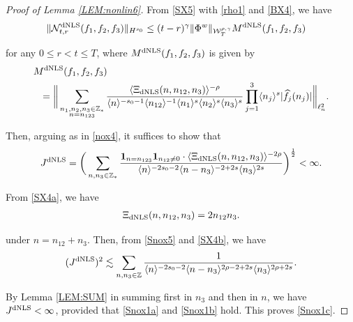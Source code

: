 \documentclass[letterpaper, 11pt,  reqno]{amsart}
\newcommand{\1}{\hspace{0.5mm}\text{I}\hspace{0.5mm}}
\newcommand{\noi}{\noindent}
\newcommand{\Z}{\mathbb{Z}}
\newcommand{\g}{\gamma}
\newcommand{\ft}{\widehat}
\renewcommand{\l}{\ell}
\newcommand{\les}{\lesssim}
\newcommand{\jb}[1]
{\langle #1 \rangle}
\newcommand{\ind}{\mathbf 1}
\newcommand{\NN}{\mathcal{N}}
\newcommand{\W}{\mathcal{W}}
\newcommand{\dNLS}{\text{\rm dNLS} }
\numberwithin{equation}{section}
\numberwithin{theorem}{section}
\begin{document}
\begin{proof}[Proof of Lemma \ref{LEM:nonlin6}]





From \eqref{SX5} with \eqref{rho1} and \eqref{BX4}, we have
\begin{align*}
 \| \NN^\dNLS_{t, r}(f_1, f_2, f_3)\|_{H^{s_0}}
&  \le
(t-r)^\g \|\Phi^w\|_{  \W^{\rho,\g}_T}M^\dNLS(f_1, f_2, f_3)
\end{align*}

\noi
for any $0 \le r < t \le T$, 
where $M^\dNLS(f_1, f_2, f_3)$ is given by 
\begin{align*}
& M^\dNLS(f_1, f_2, f_3)\\
& \ \  =\bigg\|
\sum_{\substack{n_1, n_2, n_3 \in \Z_*\\n = n_{123}}}
\frac{\jb{\Xi_\dNLS(n, n_{12}, n_3)}^{-\rho}}{\jb{n}^{-s_0 - 1}
\jb{n_{12}}^{-1}
\jb{n_1}^{s}\jb{n_2}^{s}\jb{n_3}^{s}} 
\prod_{j = 1}^3\jb{n_j}^s|\ft f_j(n_j)|
\bigg\|_{\l^2_n}.
\end{align*}


\noi
Then, arguing as in \eqref{nox4}, 
it suffices to show that 
\begin{align}
 J^\dNLS
= \bigg(\sum_{n,  n_3 \in \Z_*}
\frac{\ind_{n = n_{123}}
\ind_{n_{12} \ne0}
\cdot \jb{\Xi_\dNLS(n, n_{12}, n_3)}^{-2\rho}}
{\jb{n}^{-2s_0 - 2}
\jb{n - n_3}^{-2+2s}
\jb{n_3}^{2s}} 
\bigg)^\frac 12 < \infty.
\label{Snox5}
\end{align}







From \eqref{SX4a}, we have
\begin{align}
\Xi_\dNLS(n, n_{12}, n_3)
=  2 n_{12} n_3.
\label{SX4b}
\end{align}

\noi
 under $n = n_{12} + n_3$.
Then, from \eqref{Snox5}
and \eqref{SX4b}, we have
\begin{align*}
( J^\dNLS)^2
\les  \sum_{n,  n_3 \in \Z}
\frac{1}
{\jb{n}^{-2s_0 - 2}
\jb{n - n_3}^{2\rho-2+2s}
\jb{n_3}^{2\rho+2s}} .
\end{align*}



\noi
By
Lemma \ref{LEM:SUM}
in summing first in $n_3$ and then in $n$, we have $J^\dNLS < \infty$, 
provided that \eqref{Snox1a}
and \eqref{Snox1b} hold.
This proves 
\eqref{Snox1c}.
\end{proof}
\end{document}
